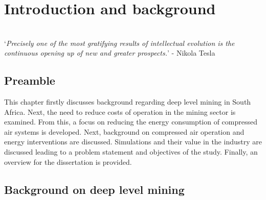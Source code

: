 \chapter{Introduction and background}  %
\thispagestyle{empty}
\vspace{38em}
\hrulefill
\\
\enquote*{\textit{Precisely one of the most gratifying results of intellectual evolution is the continuous opening up of new and greater prospects.}} -  Nikola Tesla\\
\newpage

\section{Preamble}
This chapter firstly discusses background regarding deep level mining in South Africa. Next, the need to reduce costs of operation in the mining sector is examined. From this, a focus on reducing the energy consumption of compressed air systems is developed. Next, background on compressed air operation and energy interventions are discussed. Simulations and their value in the industry are discussed leading to a problem statement and objectives of the study. Finally, an overview for the dissertation is provided.
\section{Background on deep level mining}
